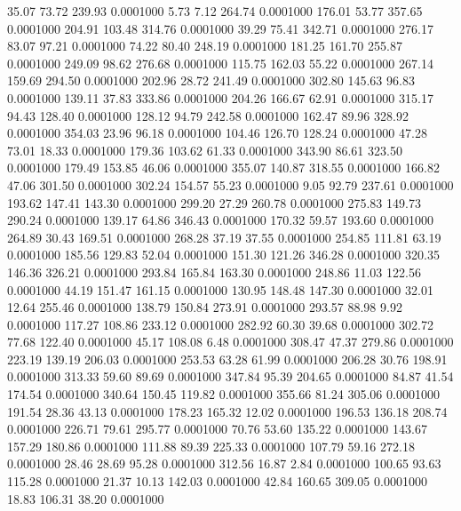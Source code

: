   35.07   73.72  239.93   0.0001000
   5.73    7.12  264.74   0.0001000
 176.01   53.77  357.65   0.0001000
 204.91  103.48  314.76   0.0001000
  39.29   75.41  342.71   0.0001000
 276.17   83.07   97.21   0.0001000
  74.22   80.40  248.19   0.0001000
 181.25  161.70  255.87   0.0001000
 249.09   98.62  276.68   0.0001000
 115.75  162.03   55.22   0.0001000
 267.14  159.69  294.50   0.0001000
 202.96   28.72  241.49   0.0001000
 302.80  145.63   96.83   0.0001000
 139.11   37.83  333.86   0.0001000
 204.26  166.67   62.91   0.0001000
 315.17   94.43  128.40   0.0001000
 128.12   94.79  242.58   0.0001000
 162.47   89.96  328.92   0.0001000
 354.03   23.96   96.18   0.0001000
 104.46  126.70  128.24   0.0001000
  47.28   73.01   18.33   0.0001000
 179.36  103.62   61.33   0.0001000
 343.90   86.61  323.50   0.0001000
 179.49  153.85   46.06   0.0001000
 355.07  140.87  318.55   0.0001000
 166.82   47.06  301.50   0.0001000
 302.24  154.57   55.23   0.0001000
   9.05   92.79  237.61   0.0001000
 193.62  147.41  143.30   0.0001000
 299.20   27.29  260.78   0.0001000
 275.83  149.73  290.24   0.0001000
 139.17   64.86  346.43   0.0001000
 170.32   59.57  193.60   0.0001000
 264.89   30.43  169.51   0.0001000
 268.28   37.19   37.55   0.0001000
 254.85  111.81   63.19   0.0001000
 185.56  129.83   52.04   0.0001000
 151.30  121.26  346.28   0.0001000
 320.35  146.36  326.21   0.0001000
 293.84  165.84  163.30   0.0001000
 248.86   11.03  122.56   0.0001000
  44.19  151.47  161.15   0.0001000
 130.95  148.48  147.30   0.0001000
  32.01   12.64  255.46   0.0001000
 138.79  150.84  273.91   0.0001000
 293.57   88.98    9.92   0.0001000
 117.27  108.86  233.12   0.0001000
 282.92   60.30   39.68   0.0001000
 302.72   77.68  122.40   0.0001000
  45.17  108.08    6.48   0.0001000
 308.47   47.37  279.86   0.0001000
 223.19  139.19  206.03   0.0001000
 253.53   63.28   61.99   0.0001000
 206.28   30.76  198.91   0.0001000
 313.33   59.60   89.69   0.0001000
 347.84   95.39  204.65   0.0001000
  84.87   41.54  174.54   0.0001000
 340.64  150.45  119.82   0.0001000
 355.66   81.24  305.06   0.0001000
 191.54   28.36   43.13   0.0001000
 178.23  165.32   12.02   0.0001000
 196.53  136.18  208.74   0.0001000
 226.71   79.61  295.77   0.0001000
  70.76   53.60  135.22   0.0001000
 143.67  157.29  180.86   0.0001000
 111.88   89.39  225.33   0.0001000
 107.79   59.16  272.18   0.0001000
  28.46   28.69   95.28   0.0001000
 312.56   16.87    2.84   0.0001000
 100.65   93.63  115.28   0.0001000
  21.37   10.13  142.03   0.0001000
  42.84  160.65  309.05   0.0001000
  18.83  106.31   38.20   0.0001000
